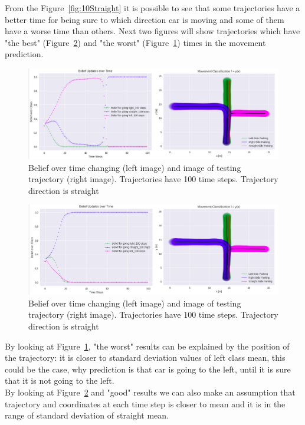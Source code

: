 From the Figure~\ref{fig:10Straight} it is possible to see that some trajectories have a better time for being sure to which direction car is moving and some of them have a worse time than others. Next two figures will show trajectories which have "the best" (Figure~\ref{fig:StraightGood}) and "the worst" (Figure~\ref{fig:StraightBad}) times in the movement prediction.

\begin{figure}[H]
	\centering  	
	\includegraphics[width=15cm]{img/bad_straight_tr.jpg}
	\caption{Belief over time changing (left image) and image of testing trajectory (right image). Trajectories have 100 time steps. Trajectory direction is straight}
	\label{fig:StraightBad}    
\end{figure}

\begin{figure}[H]
	\centering  	
	\includegraphics[width=15cm]{img/good_straight_tr.jpg}
	\caption{Belief over time changing (left image) and image of testing trajectory (right image). Trajectories have 100 time steps. Trajectory direction is straight}
	\label{fig:StraightGood}    
\end{figure}

By looking at Figure~\ref{fig:StraightBad}, "the worst" results can be explained by the position of the trajectory: it is closer to standard deviation values of left class mean, this could be the case, why prediction is that car is going to the left, until it is sure that it is not going to the left. \\
By looking at Figure~\ref{fig:StraightGood} and "good" results we can also make an assumption that trajectory and coordinates at each time step is closer to mean and it is in the range of standard deviation of straight mean.

